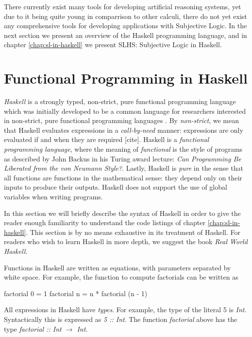 \documentclass[thesis.tex]{subfiles}
\begin{document}
There currently exist many tools for developing artificial reasoning systems, yet
due to it being quite young in comparrison to other calculi, there do not yet exist any
comprehensive tools for developing applications with Subjective Logic. In the next section
we present an overview of the Haskell programming language, and in chapter \ref{chap:sl-in-haskell}
we present SLHS: Subjective Logic in Haskell.






\section{Functional Programming in Haskell}

\emph{Haskell} is a strongly typed, non-strict, pure functional
programming language \cite{hudak1992report} which was initially
developed to be a common language for researchers interested in
non-strict, pure functional programming languages
\cite{hudak2007history}.
By \emph{non-strict}, we mean that Haskell
evaluates expressions in a \emph{call-by-need} manner: expressions are
only evaluated if and when they are required [cite]. Haskell is a
\emph{functional programming language}, where the meaning of
\emph{functional} is the style of programs as described by John Backus
in his Turing award lecture: \emph{Can Programming Be Liberated from
  the von Neumann Style?}\cite{backus1978can}.  Lastly, Haskell is
\emph{pure} in the sense that all functions are functions in the
mathematical sense: they depend only on their inputs to produce their
outputs. Haskell does not support the use of global variables when
writing programs.

In this section we will briefly describe the syntax of Haskell in
order to give the reader enough familiarity to understand the code
listings of chapter \ref{chap:sl-in-haskell}. This section is by no
means exhaustive in its treatment of Haskell. For readers who wish to
learn Haskell in more depth, we suggest the book \emph{Real World
  Haskell}.

Functions in Haskell are written as equations, with parameters separated
by white space. For example, the function to compute factorials can be
written as

\begin{spec}
factorial 0 = 1
factorial n = n * factorial (n - 1)
\end{spec}

All expressions in Haskell have \emph{types}. For example, the type of the literal
5 is \emph{Int}. Syntactically this is expressed as \emph{5 :: Int}. The function
\emph{factorial} above has the type \emph{factorial :: Int $\rightarrow$ Int}.
\end{document}
